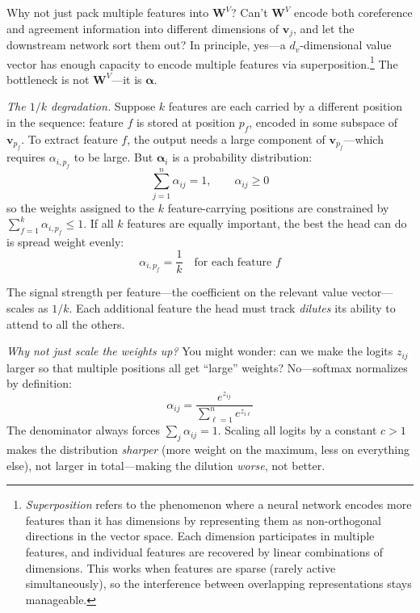 \begin{whynotbox}{Why not just pack multiple features into $\mathbf{W}^V$?}
Can't $\mathbf{W}^V$ encode both coreference and agreement information into different dimensions of $\mathbf{v}_j$, and let the downstream network sort them out? In principle, yes---a $d_v$-dimensional value vector has enough capacity to encode multiple features via superposition.\footnote{\emph{Superposition} refers to the phenomenon where a neural network encodes more features than it has dimensions by representing them as non-orthogonal directions in the vector space. Each dimension participates in multiple features, and individual features are recovered by linear combinations of dimensions. This works when features are sparse (rarely active simultaneously), so the interference between overlapping representations stays manageable.} The bottleneck is not $\mathbf{W}^V$---it is $\boldsymbol{\alpha}$.

\emph{The $1/k$ degradation.} Suppose $k$ features are each carried by a different position in the sequence: feature $f$ is stored at position $p_f$, encoded in some subspace of $\mathbf{v}_{p_f}$. To extract feature $f$, the output needs a large component of $\mathbf{v}_{p_f}$---which requires $\alpha_{i,p_f}$ to be large. But $\boldsymbol{\alpha}_i$ is a probability distribution:
\[
\sum_{j=1}^{n} \alpha_{ij} = 1, \qquad \alpha_{ij} \geq 0
\]
so the weights assigned to the $k$ feature-carrying positions are constrained by $\sum_{f=1}^{k} \alpha_{i,p_f} \leq 1$. If all $k$ features are equally important, the best the head can do is spread weight evenly:
\[
\alpha_{i,p_f} = \frac{1}{k} \quad \text{for each feature } f
\]

The signal strength per feature---the coefficient on the relevant value vector---scales as $1/k$. Each additional feature the head must track \emph{dilutes} its ability to attend to all the others.

\emph{Why not just scale the weights up?} You might wonder: can we make the logits $z_{ij}$ larger so that multiple positions all get ``large'' weights? No---softmax normalizes by definition:
\[
\alpha_{ij} = \frac{e^{z_{ij}}}{\sum_{\ell=1}^{n} e^{z_{i\ell}}}
\]
The denominator always forces $\sum_j \alpha_{ij} = 1$. Scaling all logits by a constant $c > 1$ makes the distribution \emph{sharper} (more weight on the maximum, less on everything else), not larger in total---making the dilution \emph{worse}, not better.


\end{whynotbox}
